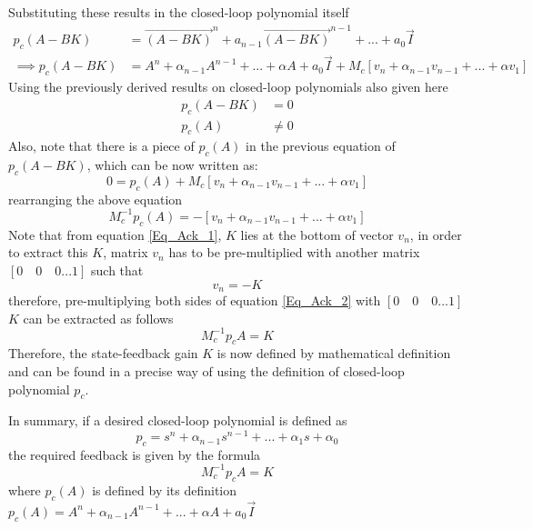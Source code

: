 Substituting these results in the closed-loop polynomial itself
\begin{align*}
	p_{c}(A - BK) &= \vec{(A - BK)}^{n} + a_{n-1}\vec{(A - BK)}^{n-1} + ... + a_{0}\vec{I} \\
	\implies p_{c}(A - BK) &= A^{n} + \alpha_{n-1}A^{n-1} + ... + \alpha A  + a_{0}\vec{I} + M_{c}[v_n + \alpha_{n-1}v_{n-1}+ ... + \alpha v_{1}]
\end{align*}
Using the previously derived results on closed-loop polynomials also given here
\begin{align}
	p_{c}(A - BK) &= 0 \\
	p_{c}(A) &\neq 0
\end{align}
Also, note that there is a piece of $p_{c}(A)$ in the previous equation of $p_{c}(A - BK)$, which can be now written as:
\begin{equation}
	0 = p_{c}(A) + M_{c}[v_n + \alpha_{n-1}v_{n-1}+ ... + \alpha v_{1}]
\end{equation}
rearranging the above equation
\begin{equation}\label{Eq_Ack_2}
	M_{c}^{-1}p_{c}(A) = -[v_n + \alpha_{n-1}v_{n-1}+ ... + \alpha v_{1}]
\end{equation}
Note that from equation \eqref{Eq_Ack_1}, $K$ lies at the bottom of vector $v_n$, in order to extract this $K$, matrix $v_n$ has to be pre-multiplied with another matrix $[0 \quad 0 \quad 0 ... 1]$ such that 
\begin{equation}
	[0 \quad 0 \quad 0 ... 1]v_{n} = -K
\end{equation}
therefore, pre-multiplying both sides of equation \eqref{Eq_Ack_2} with $[0 \quad 0 \quad 0 ... 1]$ $K$ can be extracted as follows
\begin{equation}
[0 \quad 0 \quad 0 ... 1]M_{c}^{-1}p_{c}A = K
\end{equation}
Therefore, the state-feedback gain $K$ is now defined by mathematical definition and can be found in a precise way of using the definition of closed-loop polynomial $p_c$.

In summary, if a desired closed-loop polynomial is defined as
\begin{equation*}
	p_c = s^{n} + \alpha_{n-1}s^{n-1} + ... + \alpha_{1}s + \alpha_{0}
\end{equation*}
the required feedback is given by the formula
\begin{equation*}
	[0 \quad 0 \quad 0 ... 1]M_{c}^{-1}p_{c}A = K
\end{equation*}
where $p_{c}(A)$ is defined by its definition $p_{c}(A) = A^{n} + \alpha_{n-1}A^{n-1} + ... + \alpha A  + a_{0}\vec{I}$

